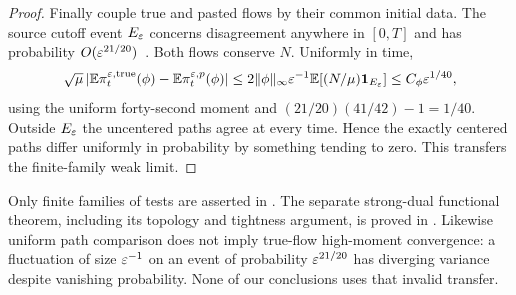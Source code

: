 \begin{proof}
Finally couple true and pasted flows by their common initial data.
The source cutoff event $E_\varepsilon$ concerns disagreement anywhere in
$[0,T]$ and has probability $O(\varepsilon^{21/20})$~\cite[\S5]{U}.
Both flows conserve $N$. Uniformly in time,
\[
 \sqrt\mu\,|\mathbb E\pi_t^{\varepsilon,\mathrm{true}}(\phi)
                    -\mathbb E\pi_t^{\varepsilon,p}(\phi)|
 \leq2\|\phi\|_\infty\varepsilon^{-1}
              \mathbb E[(N/\mu)\mathbf1_{E_\varepsilon}]
 \leq C_\phi\varepsilon^{1/40},
\]
using the uniform forty-second moment and
$(21/20)(41/42)-1=1/40$.
Outside $E_\varepsilon$ the uncentered paths agree at every time.
Hence the exactly centered paths differ uniformly in probability by
something tending to zero. This transfers the finite-family weak limit.
\end{proof}

\begin{remark}
Only finite families of tests are asserted in .
The separate strong-dual functional theorem, including its topology
and tightness argument, is proved in . Likewise uniform path comparison does not imply
true-flow high-moment convergence: a fluctuation of size $\varepsilon^{-1}$ on
an event of probability $\varepsilon^{21/20}$ has diverging variance despite
vanishing probability. None of our conclusions uses that invalid transfer.
\end{remark}
